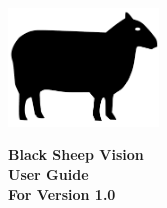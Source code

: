 
\thispagestyle{empty}

\begin{minipage}{0.25\linewidth}
  \begin{center}
    \includegraphics[width=4cm]{images/misc/bsvlogo_clean.pdf}
  \end{center}
\end{minipage}%
\begin{minipage}{0.15\linewidth}
  \hspace{2.5cm}
\end{minipage}%
\begin{minipage}{0.6\linewidth}
    \begin{flushleft}
      {\color{fancy}\normalfont\huge\bfseries Black Sheep Vision} \\
      \singlespacing
      {\color{light}\normalfont\large\bfseries User Guide\\ \normalfont\large For Version 1.0}
  \end{flushleft}
\end{minipage}%


